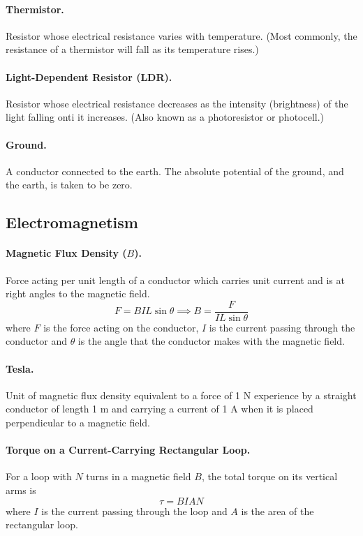 \documentclass{article}
\begin{document}
\paragraph{Thermistor.} Resistor whose electrical resistance varies with
temperature. (Most commonly, the resistance of a thermistor will fall as its
temperature rises.)

\paragraph{Light-Dependent Resistor (LDR).} Resistor whose electrical resistance
decreases as the intensity (brightness) of the light falling onti it increases.
(Also known as a photoresistor or photocell.)

\paragraph{Ground.} A conductor connected to the earth. The absolute potential
of the ground, and the earth, is taken to be zero.

\subsection{Electromagnetism}

\paragraph{Magnetic Flux Density ($B$).} Force acting per unit length of a
conductor which carries unit current and is at right angles to the magnetic
field. \begin{equation} F = BIL\sin\theta \implies B = \frac{F}{IL\sin\theta}
\end{equation} where $F$ is the force acting on the conductor, $I$ is the
current passing through the conductor and $\theta$ is the angle that the
conductor makes with the magnetic field.

\paragraph{Tesla.} Unit of magnetic flux density equivalent to a force of 1 N
experience by a straight conductor of length 1 m and carrying a current of 1 A
when it is placed perpendicular to a magnetic field.

\paragraph{Torque on a Current-Carrying Rectangular Loop.} For a loop with $N$
turns in a magnetic field $B$, the total torque on its vertical arms is
\begin{equation} \tau = BIAN \end{equation} where $I$ is the current passing
  through the loop and $A$ is the area of the rectangular loop.
\end{document}
